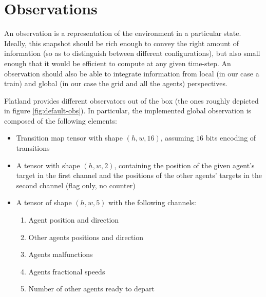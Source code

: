 \documentclass[a4paper,10pt]{report}
\begin{document}
\section{Observations}\label{sec:obs}
An observation is a representation of the environment in a particular state. Ideally, this snapshot should be rich enough to convey the right amount of information (so as to distinguish between different configurations), but also small enough that it would be efficient to compute at any given time-step. An observation should also be able to integrate information from local (in our case a train) and global (in our case the grid and all the agents) perspectives.

Flatland provides different observators out of the box (the ones roughly depicted in figure \ref{fig:default-obs}). In particular, the implemented global observation is composed of the following elements:
\begin{itemize}
	\item Transition map tensor with shape $(h, w, 16)$, assuming $16$ bits encoding of transitions
	\item A tensor with shape $(h, w, 2)$, containing the position of the given agent's target in the first channel and the positions of the other agents' targets in the second channel (flag only, no counter)
	\item A tensor of shape $(h, w, 5)$ with the following channels:
	\begin{enumerate}
		\item Agent position and direction
		\item Other agents positions and direction
		\item Agents malfunctions
		\item Agents fractional speeds
		\item Number of other agents ready to depart
	\end{enumerate}
\end{itemize}
\end{document}
